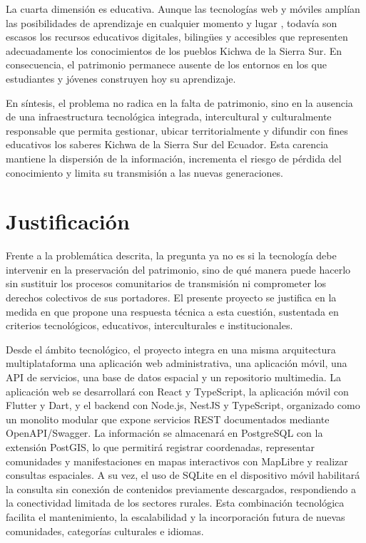 La cuarta dimensión es educativa. Aunque las tecnologías web y móviles amplían las posibilidades de aprendizaje en cualquier momento y lugar \cite{sarrab2012mobile}, todavía son escasos los recursos educativos digitales, bilingües y accesibles que representen adecuadamente los conocimientos de los pueblos Kichwa de la Sierra Sur. En consecuencia, el patrimonio permanece ausente de los entornos en los que estudiantes y jóvenes construyen hoy su aprendizaje.

En síntesis, el problema no radica en la falta de patrimonio, sino en la ausencia de una infraestructura tecnológica integrada, intercultural y culturalmente responsable que permita gestionar, ubicar territorialmente y difundir con fines educativos los saberes Kichwa de la Sierra Sur del Ecuador. Esta carencia mantiene la dispersión de la información, incrementa el riesgo de pérdida del conocimiento y limita su transmisión a las nuevas generaciones.

\section{Justificación}
Frente a la problemática descrita, la pregunta ya no es si la tecnología debe intervenir en la preservación del patrimonio, sino de qué manera puede hacerlo sin sustituir los procesos comunitarios de transmisión ni comprometer los derechos colectivos de sus portadores. El presente proyecto se justifica en la medida en que propone una respuesta técnica a esta cuestión, sustentada en criterios tecnológicos, educativos, interculturales e institucionales.

Desde el ámbito tecnológico, el proyecto integra en una misma arquitectura multiplataforma una aplicación web administrativa, una aplicación móvil, una API de servicios, una base de datos espacial y un repositorio multimedia. La aplicación web se desarrollará con React y TypeScript, la aplicación móvil con Flutter y Dart, y el backend con Node.js, NestJS y TypeScript, organizado como un monolito modular que expone servicios REST documentados mediante OpenAPI/Swagger. La información se almacenará en PostgreSQL con la extensión PostGIS, lo que permitirá registrar coordenadas, representar comunidades y manifestaciones en mapas interactivos con MapLibre y realizar consultas espaciales. A su vez, el uso de SQLite en el dispositivo móvil habilitará la consulta sin conexión de contenidos previamente descargados, respondiendo a la conectividad limitada de los sectores rurales. Esta combinación tecnológica facilita el mantenimiento, la escalabilidad y la incorporación futura de nuevas comunidades, categorías culturales e idiomas.

